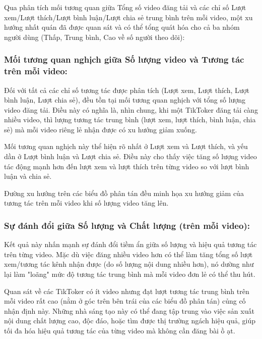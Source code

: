 Qua phân tích mối tương quan giữa Tổng số video đăng tải và các chỉ số Lượt xem/Lượt thích/Lượt bình luận/Lượt chia sẻ trung bình trên mỗi video, một xu hướng nhất quán đã được quan sát và có thể tổng quát hóa cho cả ba nhóm người dùng (Thấp, Trung bình, Cao về số người theo dõi):

\subsubsection*{Mối tương quan nghịch giữa Số lượng video và Tương tác trên mỗi video:}

Đối với tất cả các chỉ số tương tác được phân tích (Lượt xem, Lượt thích, Lượt bình luận, Lượt chia sẻ), đều tồn tại mối tương quan nghịch với tổng số lượng video đăng tải. Điều này có nghĩa là, nhìn chung, khi một TikToker đăng tải càng nhiều video, thì lượng tương tác trung bình (lượt xem, lượt thích, bình luận, chia sẻ) mà mỗi video riêng lẻ nhận được có xu hướng giảm xuống.

Mối tương quan nghịch này thể hiện rõ nhất ở Lượt xem và Lượt thích, và yếu dần ở Lượt bình luận và Lượt chia sẻ. Điều này cho thấy việc tăng số lượng video tác động mạnh hơn đến lượt xem và lượt thích trên từng video so với lượt bình luận và chia sẻ.

Đường xu hướng trên các biểu đồ phân tán đều minh họa xu hướng giảm của tương tác trên mỗi video khi số lượng video tăng lên.

\subsubsection*{Sự đánh đổi giữa Số lượng và Chất lượng (trên mỗi video):}

Kết quả này nhấn mạnh sự đánh đổi tiềm ẩn giữa số lượng và hiệu quả tương tác trên từng video. Mặc dù việc đăng nhiều video hơn có thể làm tăng tổng số lượt xem/tương tác kênh nhận được (do số lượng nội dung nhiều hơn), nó dường như lại làm "loãng" mức độ tương tác trung bình mà mỗi video đơn lẻ có thể thu hút.

Quan sát về các TikToker có ít video nhưng đạt lượt tương tác trung bình trên mỗi video rất cao (nằm ở góc trên bên trái của các biểu đồ phân tán) củng cố nhận định này. Những nhà sáng tạo này có thể đang tập trung vào việc sản xuất nội dung chất lượng cao, độc đáo, hoặc tìm được thị trường ngách hiệu quả, giúp tối đa hóa hiệu quả tương tác của từng video mà không cần đăng bài ồ ạt.

